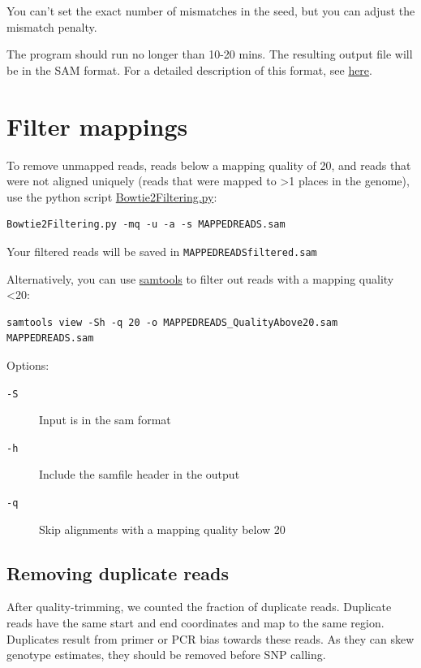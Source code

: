 \documentclass[11pt]{article}
\begin{document}
You can't set the exact number of mismatches in the seed, but you can
adjust the mismatch penalty.  

The program should run no longer than 10-20 mins. The resulting output file will be
in the SAM format. For a detailed description of this format, see \href{https://samtools.github.io/hts-specs/SAMv1.pdf}{here}.

\section{Filter mappings}
\label{sec-2}
To remove unmapped reads, reads below a mapping quality of 20, and
reads that were not aligned uniquely (reads that were mapped to >1
places in the genome), use the python script \href{http://marinetics.org/2015/03/03/Bowtie2Filtering.html}{Bowtie2Filtering.py}:

\begin{verbatim}
Bowtie2Filtering.py -mq -u -a -s MAPPEDREADS.sam
\end{verbatim}

Your filtered reads will be saved in \texttt{MAPPEDREADSfiltered.sam}

Alternatively, you can 
use \href{http://samtools.sourceforge.net/samtools.shtml#mpileup}{samtools} to filter out reads with a mapping quality <20:

\begin{verbatim}
samtools view -Sh -q 20 -o MAPPEDREADS_QualityAbove20.sam MAPPEDREADS.sam
\end{verbatim}

Options:

\begin{description}
\item[{\texttt{-S}}] Input is in the sam format
\item[{\texttt{-h}}] Include the samfile header in the output
\item[{\texttt{-q}}] Skip alignments with a mapping quality below 20
\end{description}

\subsection{Removing duplicate reads}
\label{sec-2-1}
After quality-trimming, we counted the fraction of duplicate
reads. Duplicate reads have the same start and end
coordinates and map to the same region. Duplicates result from primer
or PCR bias towards these reads. As they can skew genotype estimates,
they should be removed before SNP calling.
\end{document}
